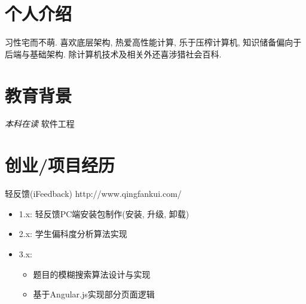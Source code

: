 \documentclass{resume}
\begin{document}



\begin{multicols}{2} %

\section{\faUser 个人介绍}
习性宅而不萌.
\newline
喜欢底层架构, 热爱高性能计算, 乐于压榨计算机, 知识储备偏向于后端与基础架构.
\newline
除计算机技术及相关外还喜涉猎社会百科.

\section{\faGraduationCap 教育背景}
\textit{本科在读} 软件工程

\section{\faStar 创业/项目经历}
\begin{onehalfspacing}
轻反馈(iFeedback)
\newline
http://www.qingfankui.com/
\begin{itemize}
  \item 1.x: 轻反馈PC端安装包制作(安装, 升级, 卸载)
  \item 2.x: 学生偏科度分析算法实现
  \item 3.x:
  \begin{itemize} 
    \item 题目的模糊搜索算法设计与实现 
    \item 基于Angular.js实现部分页面逻辑
  \end{itemize}
\end{itemize}
\end{onehalfspacing}


\end{multicols}
\end{document}
